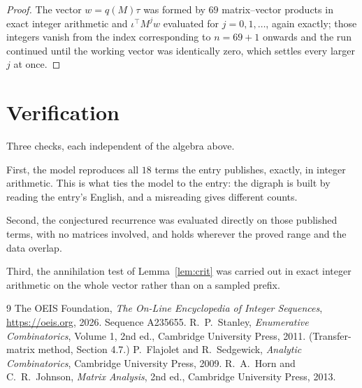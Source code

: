 \documentclass[11pt,a4paper]{article}
\theoremstyle{plain}
\theoremstyle{definition}
\begin{document}
\begin{proof}
The vector $w=q(M)\tau$ was formed by $69$ matrix--vector products in exact integer
arithmetic and $\iota^{\!\top}M^{j}w$ evaluated for $j=0,1,\dots$, again exactly; those
integers vanish from the index corresponding to $n=69+1$ onwards and the run continued
until the working vector was identically zero, which settles every larger $j$ at once.
\end{proof}

\section{Verification}

Three checks, each independent of the algebra above.

First, the model reproduces all $18$ terms the entry publishes, exactly, in integer
arithmetic. This is what ties the model to the entry: the digraph is built by reading the
entry's English, and a misreading gives different counts.

Second, the conjectured recurrence was evaluated directly on those published terms, with no
matrices involved, and holds wherever the proved range and the data overlap.

Third, the annihilation test of Lemma~\ref{lem:crit} was carried out in exact integer
arithmetic on the whole vector rather than on a sampled prefix.

\begin{thebibliography}{9}
 The OEIS Foundation, \emph{The On-Line Encyclopedia of Integer
Sequences}, \url{https://oeis.org}, 2026. Sequence A235655.
 R.~P.~Stanley, \emph{Enumerative Combinatorics}, Volume 1, 2nd ed.,
Cambridge University Press, 2011. (Transfer-matrix method, Section 4.7.)
 P.~Flajolet and R.~Sedgewick, \emph{Analytic Combinatorics}, Cambridge
University Press, 2009.
 R.~A.~Horn and C.~R.~Johnson, \emph{Matrix Analysis}, 2nd ed., Cambridge
University Press, 2013.
\end{thebibliography}
\end{document}
